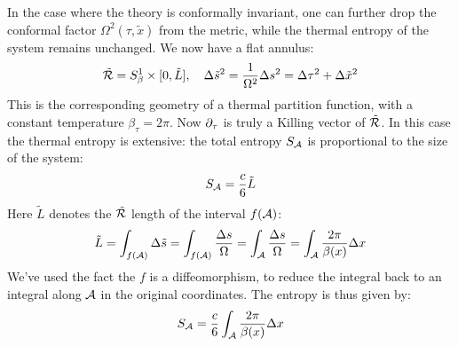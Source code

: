 \documentclass[11pt,a4paper]{article}
\begin{document}
	In the case where the theory is conformally invariant, one can further drop the conformal factor $\Omega^2(\tau,\tilde{x})$ from the metric, while the thermal entropy of the system remains unchanged. We now have a flat annulus:
	\begin{equation}
		\tilde{\mathcal{R}}
		= S^1_\beta \times [0,\tilde{L}],
	\quad
		\Delta{\tilde{s}}^2
		= \frac{1}{\Omega^2} \Delta{s}^2
		= \Delta{\tau}^2 + \Delta{\tilde{x}}^2
	\end{equation}
	This is the corresponding geometry of a thermal partition function, with a constant temperature $\beta_\tau = 2\pi$. 
	Now $\partial_{\tau}$ is truly a Killing vector of $\tilde{\mathcal{R}}$. 
	In this case the thermal entropy is extensive: the total entropy $S_{\mathcal{A}}$ is proportional to the size of the system:
	\begin{equation}
		S_{\mathcal{A}}
		= \frac{c}{6} \tilde{L}
	\end{equation}
	Here $\tilde{L}$ denotes the $\tilde{\mathcal{R}}$ length of the interval $f(\mathcal{A})$:
	\begin{equation}
		\tilde{L}
		= \int_{f(\mathcal{A})} \Delta{\tilde{s}}
		= \int_{f(\mathcal{A})} \frac{\Delta{s}}{\Omega}
		= \int_{\mathcal{A}} \frac{\Delta{s}}{\Omega}
		= \int_{\mathcal{A}} \frac{2\pi}{\beta(x)} \Delta{x}
	\end{equation}
	We've used the fact the $f$ is a diffeomorphism, to reduce the integral back to an integral along $\mathcal{A}$ in the original coordinates. 
	The entropy is thus given by:
	\begin{equation}
		S_{\mathcal{A}}
		= \frac{c}{6}
			\int_{\mathcal{A}} \frac{2\pi}{\beta(x)} \Delta{x}
	\end{equation}
	
\end{document}
